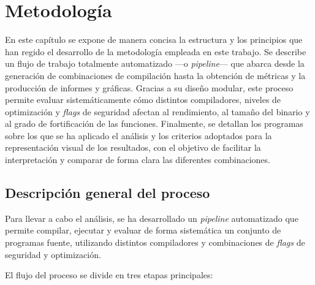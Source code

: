 \chapter{Metodología}
\label{chap:metodologia}

En este capítulo se expone de manera concisa la estructura y los principios que han regido el desarrollo de la metodología empleada en este trabajo. Se describe un flujo de trabajo totalmente automatizado —o \emph{pipeline}— que abarca desde la generación de combinaciones de compilación hasta la obtención de métricas y la producción de informes y gráficas. Gracias a su diseño modular, este proceso permite evaluar sistemáticamente cómo distintos compiladores, niveles de optimización y \emph{flags} de seguridad afectan al rendimiento, al tamaño del binario y al grado de fortificación de las funciones. Finalmente, se detallan los programas sobre los que se ha aplicado el análisis y los criterios adoptados para la representación visual de los resultados, con el objetivo de facilitar la interpretación y comparar de forma clara las diferentes combinaciones.


\section{Descripción general del proceso}

Para llevar a cabo el análisis, se ha desarrollado un \emph{pipeline}
automatizado que permite compilar, ejecutar y evaluar de forma
sistemática un conjunto de programas fuente, utilizando distintos
compiladores y combinaciones de \emph{flags} de seguridad y
optimización.

El flujo del proceso se divide en tres etapas principales:

